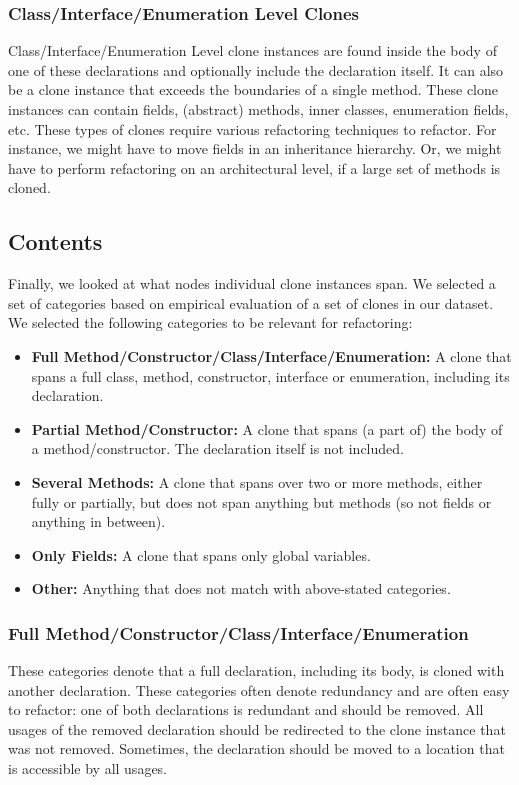 \documentclass[runningheads]{llncs}
\begin{document}
\subsubsection{Class/Interface/Enumeration Level Clones}
Class/Interface/Enumeration Level clone instances are found inside the body of one of these declarations and optionally include the declaration itself. It can also be a clone instance that exceeds the boundaries of a single method. These clone instances can contain fields, (abstract) methods, inner classes, enumeration fields, etc. These types of clones require various refactoring techniques to refactor. For instance, we might have to move fields in an inheritance hierarchy. Or, we might have to perform refactoring on an architectural level, if a large set of methods is cloned.


\subsection{Contents}\label{sec:setupcontents}
Finally, we looked at what nodes individual clone instances span. We selected a set of categories based on empirical evaluation of a set of clones in our dataset. We selected the following categories to be relevant for refactoring:
\begin{itemize}
  \item \textbf{Full Method/Constructor/Class/Interface/Enumeration:} A clone that spans a full class, method, constructor, interface or enumeration, including its declaration.
  \item \textbf{Partial Method/Constructor:} A clone that spans (a part of) the body of a method/constructor. The declaration itself is not included.
  \item \textbf{Several Methods:} A clone that spans over two or more methods, either fully or partially, but does not span anything but methods (so not fields or anything in between).
  \item \textbf{Only Fields:} A clone that spans only global variables.
  \item \textbf{Other:} Anything that does not match with above-stated categories.
\end{itemize}

\subsubsection{Full Method/Constructor/Class/Interface/Enumeration}
These categories denote that a full declaration, including its body, is cloned with another declaration. These categories often denote redundancy and are often easy to refactor: one of both declarations is redundant and should be removed. All usages of the removed declaration should be redirected to the clone instance that was not removed. Sometimes, the declaration should be moved to a location that is accessible by all usages. 
\end{document}
